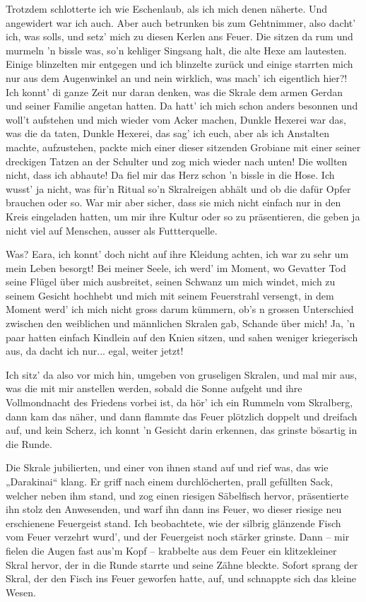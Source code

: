 \documentclass[10pt, a4paper, oneside]{book}
\begin{document}
Trotzdem schlotterte ich wie Eschenlaub, als ich mich denen näherte. Und angewidert war ich auch. Aber auch betrunken bis zum Gehtnimmer, also dacht’ ich, was solls, und setz’ mich zu diesen Kerlen ans Feuer. Die sitzen da rum und murmeln ’n bissle was, so’n kehliger Singsang halt, die alte Hexe am lautesten. Einige blinzelten mir entgegen und ich blinzelte zurück und einige starrten mich nur aus dem Augenwinkel an und nein wirklich, was mach’ ich eigentlich hier?! Ich konnt’ di ganze Zeit nur daran denken, was die Skrale dem armen Gerdan und seiner Familie angetan hatten. Da hatt’ ich mich schon anders besonnen und woll’t aufstehen und mich wieder vom Acker machen, Dunkle Hexerei war das, was die da taten, Dunkle Hexerei, das sag’ ich euch, aber als ich Anstalten machte, aufzustehen, packte mich einer dieser sitzenden Grobiane mit einer seiner dreckigen Tatzen an der Schulter und zog mich wieder nach unten! Die wollten nicht, dass ich abhaute! Da fiel mir das Herz schon ’n bissle in die Hose. Ich wusst’ ja nicht, was für’n Ritual so’n Skralreigen abhält und ob die dafür Opfer brauchen oder so. War mir aber sicher, dass sie mich nicht einfach nur in den Kreis eingeladen hatten, um mir ihre Kultur oder so zu präsentieren, die geben ja nicht viel auf Menschen, ausser als Futtterquelle.

Was? Eara, ich konnt’ doch nicht auf ihre Kleidung achten, ich war zu sehr um mein Leben besorgt! Bei meiner Seele, ich werd’ im Moment, wo Gevatter Tod seine Flügel über mich ausbreitet, seinen Schwanz um mich windet, mich zu seinem Gesicht hochhebt und mich mit seinem Feuerstrahl versengt, in dem Moment werd’ ich mich nicht gross darum kümmern, ob’s n grossen Unterschied zwischen den weiblichen und männlichen Skralen gab, Schande über mich! Ja, ’n paar hatten einfach Kindlein auf den Knien sitzen, und sahen weniger kriegerisch aus, da dacht ich nur... egal, weiter jetzt!

Ich sitz’ da also vor mich hin, umgeben von gruseligen Skralen, und mal mir aus, was die mit mir anstellen werden, sobald die Sonne aufgeht und ihre Vollmondnacht des Friedens vorbei ist, da hör’ ich ein Rummeln vom Skralberg, dann kam das näher, und dann flammte das Feuer plötzlich doppelt und dreifach auf, und kein Scherz, ich konnt ’n Gesicht darin erkennen, das grinste bösartig in die Runde.

Die Skrale jubilierten, und einer von ihnen stand auf und rief was, das wie „Darakinai“ klang. Er griff nach einem durchlöcherten, prall gefüllten Sack, welcher neben ihm stand, und zog einen riesigen Säbelfisch hervor, präsentierte ihn stolz den Anwesenden, und warf ihn dann ins Feuer, wo dieser riesige neu erschienene Feuergeist stand. Ich beobachtete, wie der silbrig glänzende Fisch vom Feuer verzehrt wurd', und der Feuergeist noch stärker grinste. Dann – mir fielen die Augen fast aus’m Kopf – krabbelte aus dem Feuer ein klitzekleiner Skral hervor, der in die Runde starrte und seine Zähne bleckte. Sofort sprang der Skral, der den Fisch ins Feuer geworfen hatte, auf, und schnappte sich das kleine Wesen.
\end{document}
